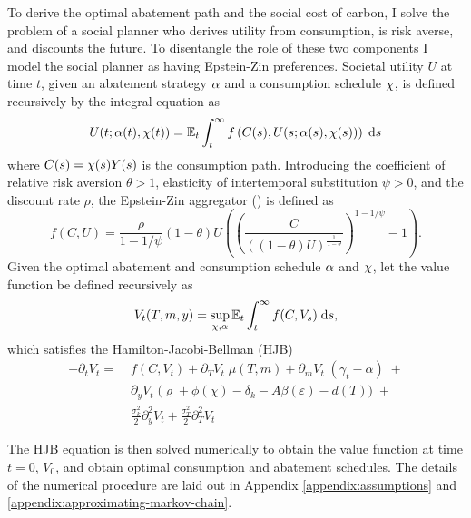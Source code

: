 \documentclass[../../main.tex]{subfiles}
\begin{document}
To derive the optimal abatement path and the social cost of carbon, I solve the problem of a social planner who derives utility from consumption, is risk averse, and discounts the future. To disentangle the role of these two components I model the social planner as having Epstein-Zin preferences. Societal utility $U$ at time $t$, given an abatement strategy $\alpha$ and a consumption schedule $\chi$, is defined recursively by the integral equation as \begin{equation} \label{eq:utility}
    U(t; \alpha(t), \chi(t)) = \operatorname{\mathbb{E}}_t \int^{\infty}_t f\left(C(s), U(s; \alpha(s), \chi(s))\right) \; \mathrm{d}s
\end{equation} where $C(s) = \chi(s) Y(s)$ is the consumption path. Introducing the coefficient of relative risk aversion $\theta > 1$, elasticity of intertemporal substitution $\psi > 0$, and the discount rate $\rho$, the Epstein-Zin aggregator (\cite{duffie_asset_1992}) is defined as \begin{equation} \label{eq:aggregator}
    f(C, U) = \frac{\rho}{1 - 1 / \psi} (1 - \theta) U  \left( \left(\frac{C}{((1 - \theta) U)^{\frac{1}{1 - \theta}}}\right)^{1 - 1 / \psi} - 1 \right).
\end{equation} Given the optimal abatement and consumption schedule $\alpha$ and $\chi$, let the value function be defined recursively as \begin{equation}
    V_t(T, m, y) = \sup_{\chi, \alpha} \operatorname{\mathbb{E}}_t \int^{\infty}_t f(C, V_s) \; \mathrm{d}s,
\end{equation} which satisfies the  Hamilton-Jacobi-Bellman (HJB) \begin{equation}
    \begin{split}
        -\partial_t V_t = \; &f(C, V_t) + \partial_T V_t \; \mu(T, m) + \partial_m V_t \; (\gamma_t - \alpha) \; + \\
        &\partial_y V_t \; \Big(\varrho + \phi(\chi) - \delta_k - A \beta(\varepsilon) - d(T) \Big) \; + \\
        &\frac{\sigma^2_k}{2} \partial^2_y V_t + \frac{\sigma^2_T}{2} \partial^2_T V_t
    \end{split}
\end{equation}

The HJB equation is then solved numerically to obtain the value function at time $t = 0$, $V_0$, and obtain optimal consumption and abatement schedules. The details of the numerical procedure are laid out in Appendix \ref{appendix:assumptions} and \ref{appendix:approximating-markov-chain}.
\end{document}
